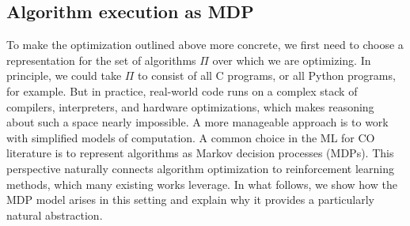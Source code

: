 \documentclass[a4paper]{report}
\theoremstyle{definition}
\theoremstyle{plain}
\begin{document}
\subsection{Algorithm execution as MDP}

To make the optimization outlined above more concrete, we first need to choose a
representation for the set of algorithms $\Pi$ over which we are
optimizing. In principle, we could take $\Pi$ to consist of all C
programs, or all Python programs, for example. But in practice, real-world code
runs on a complex stack of compilers, interpreters, and hardware optimizations,
which makes reasoning about such a space nearly impossible. A more manageable
approach is to work with simplified models of computation. A common choice in
the ML for CO literature is to represent algorithms as Markov decision processes
(MDPs). This perspective naturally connects algorithm optimization to
reinforcement learning methods, which many existing works leverage. In what
follows, we show how the MDP model arises in this setting and explain why it
provides a particularly natural abstraction.
\end{document}

